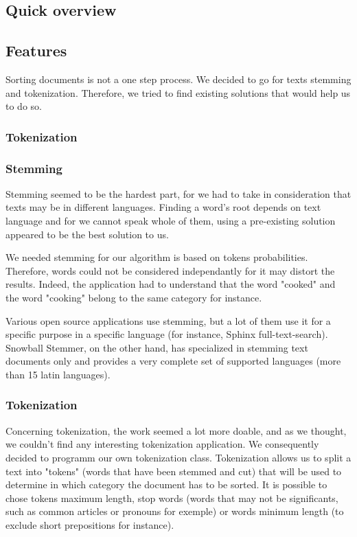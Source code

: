 \documentclass[a4paper,11pt]{article}
\begin{document}
\subsection{Quick overview}

\subsection{Features}

Sorting documents is not a one step process. We decided to go for texts
stemming and tokenization. Therefore, we tried to find existing solutions that
would help us to do so.

\subsubsection{Tokenization}

\subsubsection{Stemming}

Stemming seemed to be the hardest part, for we had to take in consideration
that texts may be in different languages. Finding a word's root depends on
text language and for we cannot speak whole of them, using a pre-existing
solution appeared to be the best solution to us.

We needed stemming for our algorithm is based on tokens probabilities.
Therefore, words could not be considered independantly for it may distort
the results. Indeed, the application had to understand that the word "cooked"
and the word "cooking" belong to the same category for instance.

Various open source applications use stemming, but a lot of them use it for
a specific purpose in a specific language (for instance, Sphinx
full-text-search). Snowball Stemmer, on the other hand, has specialized in
stemming text documents only and provides a very complete set of supported
languages (more than 15 latin languages).

\subsubsection{Tokenization}

Concerning tokenization, the work seemed a lot more doable, and as we
thought, we couldn't find any interesting tokenization application. We
consequently decided to programm our own tokenization class.
Tokenization allows us to split a text into "tokens" (words that have
been stemmed and cut) that will be used to determine in which category the
document has to be sorted. It is possible to chose tokens maximum length,
stop words (words that may not be significants, such as common articles or
pronouns for exemple) or words minimum length (to exclude short prepositions
for instance).
\end{document}

